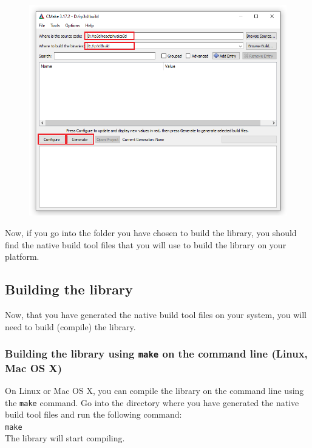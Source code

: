 \documentclass[a4paper,12pt]{article}
\begin{document}
    \begin{figure}[!ht]
        \centering
	\includegraphics[scale=0.6]{CMakeWin.png}
        \label{fig:cmakewin}
    \end{figure}

     Now, if you go into the folder you have chosen to build the library, you should find the native build tool files that you will use to build
     the library on your platform.

     \subsection{Building the library}

     Now, that you have generated the native build tool files on your system, you will need to build (compile) the library.

     \subsubsection{Building the library using \texttt{make} on the command line (Linux, Mac OS X)}

     On Linux or Mac OS X, you can compile the library on the command line using the \texttt{make} command. Go into the directory where you have generated the
     native build tool files and run the following command: \\

     \texttt{make} \\

     The library will start compiling. 
\end{document}
